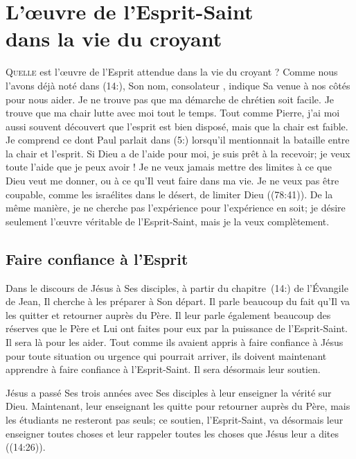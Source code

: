 \chapter[L'\oe{}uvre de l'Esprit-Saint dans la vie du croyant]{L'\oe{}uvre de l'Esprit-Saint\\ dans la vie du croyant}
\renewcommand{\chaphead}{\textls[0]{L'\oe{}uvre de l'Esprit-Saint dans la vie du croyant}}

\lettrine{Q}{uelle} est l'œuvre de l'Esprit
 attendue dans la vie du croyant ?
 Comme nous l'avons déjà noté dans (14:), Son nom,
 \Og con\-so\-la\-teur \Fg{}, indique Sa venue à nos côtés pour nous aider.
 Je ne trouve pas que ma démarche de chrétien soit facile.
 Je trouve que ma chair lutte avec moi tout le temps.
 Tout comme Pierre, j'ai moi aussi souvent découvert que l'esprit
 est bien disposé, mais que la chair est faible.
 Je comprend ce dont Paul parlait dans (5:) lorsqu'il
 mentionnait la bataille entre la chair et l'esprit.
 Si Dieu a de l'aide pour moi, je suis prêt à la recevoir;
 je veux toute l'aide que je peux avoir !
 Je ne veux jamais mettre des limites à ce que Dieu veut me donner,
 ou à ce qu'Il veut faire dans ma vie. Je ne veux pas être coupable,
 comme les israélites dans le désert,
 de limiter Dieu ((78:41)).
 De la même manière, je ne cherche pas l'expérience 
 pour l'expérience en soit; je désire seulement l'œuvre véritable
 de l'Esprit-Saint, mais je la veux complètement.

\section{Faire confiance \`a l'Esprit}

Dans le discours de Jésus à Ses disciples, à partir du chapitre~(14:)
 de l'Évangile de Jean, Il cherche à les préparer à Son départ.
 Il parle beaucoup du fait qu'Il va les quitter et retourner auprès du Père.
 Il leur parle également beaucoup des réserves que le Père et Lui
 ont faites pour eux par la puissance de l'Esprit-Saint.
 Il sera là pour les aider. Tout comme ils avaient appris à faire confiance
 à Jésus pour toute situation ou urgence qui pourrait arriver,
 ils doivent maintenant apprendre à faire confiance à l'Esprit-Saint.
 Il sera désormais leur soutien.

Jésus a passé Ses trois années avec Ses disciples à leur enseigner
 la vérité sur Dieu. Maintenant, leur enseignant les quitte pour retourner
 auprès du Père, mais les étudiants ne resteront pas seuls;
 ce soutien, l'Esprit-Saint, va désormais leur enseigner toutes choses
 et leur rappeler toutes les choses que Jésus leur a dites
 ((14:26)).

